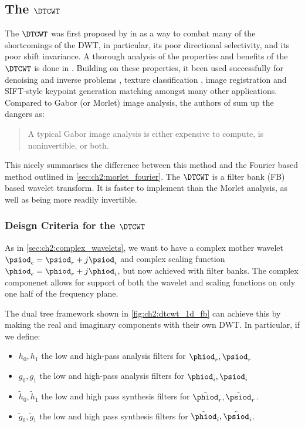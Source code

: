\subsection{The $\DTCWT$}
  The $\DTCWT$ was first proposed by \citeauthor{kingsbury_dual-tree_1998} in
  \cite{kingsbury_dual-tree_1998, kingsbury_dual-tree_1998-1} as a way to combat
  many of the shortcomings of the DWT, in particular, its poor directional
  selectivity, and its poor shift invariance. A thorough analysis of the
  properties and benefits of the $\DTCWT$ is done in
  \cite{kingsbury_image_1999,selesnick_dual-tree_2005}. Building on these
  properties, it been used
  successfully for denoising and inverse problems \cite{rivaz_bayesian_2001,
  zhang_bayesian_2008, zhang_variational_2015, miller_image_2008}, texture
  classification \cite{hatipoglu_texture_1999, rivaz_complex_1999}, image
  registration \cite{loo_motion-estimation-based_2001, chen_efficient_2012}
  and SIFT-style keypoint generation matching \cite{fauqueur_multiscale_2006,
  anderson_determining_2005, anderson_rotation-invariant_2006,
  bendale_multiscale_2010, ng_robust_2012} amongst many other applications. 
  Compared to Gabor (or Morlet) image analysis, the authors of
  \cite{selesnick_dual-tree_2005} sum up the dangers as:
  \begin{quote}
    A typical Gabor image analysis is either expensive to compute, is
    noninvertible, or both.
  \end{quote}
  This nicely summarises the difference between this method and the Fourier
  based method outlined in \autoref{sec:ch2:morlet_fourier}. The $\DTCWT$ is
  a filter bank (FB) based wavelet transform. It is faster
  to implement than the Morlet analysis, as well as being more readily invertible.

\subsubsection{Deisgn Criteria for the $\DTCWT$}
  As in \autoref{sec:ch2:complex_wavelets}, we want to have a complex mother
  wavelet $\psiod_c = \psiod_r + j\psiod_i$ and complex scaling function $\phiod_c =
  \phiod_r + j\phiod_i$, but now achieved with filter banks. The complex componenet
  allows for support of both the wavelet and scaling functions on only one half of
  the frequency plane. 
  
  The dual tree framework shown in \autoref{fig:ch2:dtcwt_1d_fb} can achieve this 
  by making the real and imaginary components with their own DWT. In particular, if
  we define:
  \begin{itemize}
    \item $h_0, h_1$ the low and high-pass analysis filters for $\phiod_r, \psiod_r$  
    \item $g_0, g_1$ the low and high-pass analysis filters for $\phiod_i, \psiod_i$
    \item $\tilde{h}_0, \tilde{h}_1$ the low and high pass synthesis filters
      for $\tilde{\phiod}_r, \tilde{\psiod}_r$.
    \item $\tilde{g}_0, \tilde{g}_1$ the low and high pass synthesis filters for
      $\tilde{\phiod}_i, \tilde{\psiod}_i$.
  \end{itemize}

